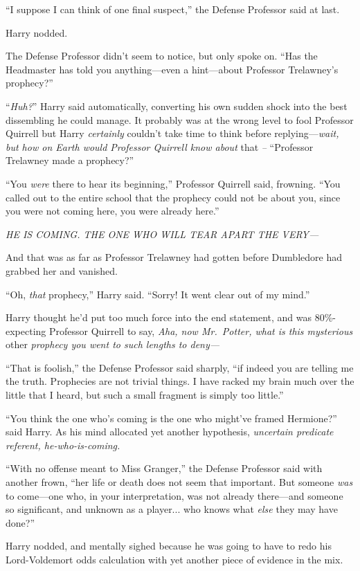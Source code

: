 “I suppose I can think of one final suspect,” the Defense Professor said at last.

Harry nodded.

The Defense Professor didn’t seem to notice, but only spoke on. “Has the Headmaster has told you anything—even a hint—about Professor Trelawney’s prophecy?”

“\emph{Huh?}” Harry said automatically, converting his own sudden shock into the best dissembling he could manage. It probably was at the wrong level to fool Professor Quirrell but Harry \emph{certainly} couldn’t take time to think before replying—\emph{wait, but how on Earth would Professor Quirrell know about} that \emph{–} “Professor Trelawney made a prophecy?”

“You \emph{were} there to hear its beginning,” Professor Quirrell said, frowning. “You called out to the entire school that the prophecy could not be about you, since you were not coming here, you were already here.”

\emph{HE IS COMING. THE ONE WHO WILL TEAR APART THE VERY—}

And that was as far as Professor Trelawney had gotten before Dumbledore had grabbed her and vanished.

“Oh, \emph{that} prophecy,” Harry said. “Sorry! It went clear out of my mind.”

Harry thought he’d put too much force into the end statement, and was 80\%-expecting Professor Quirrell to say, \emph{Aha, now Mr.~Potter, what is this mysterious} other \emph{prophecy you went to such lengths to deny—}

“That is foolish,” the Defense Professor said sharply, “if indeed you are telling me the truth. Prophecies are not trivial things. I have racked my brain much over the little that I heard, but such a small fragment is simply too little.”

“You think the one who’s coming is the one who might’ve framed Hermione?” said Harry. As his mind allocated yet another hypothesis, \emph{uncertain predicate referent, he-who-is-coming.}

“With no offense meant to Miss Granger,” the Defense Professor said with another frown, “her life or death does not seem that important. But someone \emph{was} to come—one who, in your interpretation, was not already there—and someone so significant, and unknown as a player... who knows what \emph{else} they may have done?”

Harry nodded, and mentally sighed because he was going to have to redo his Lord-Voldemort odds calculation with yet another piece of evidence in the mix.


